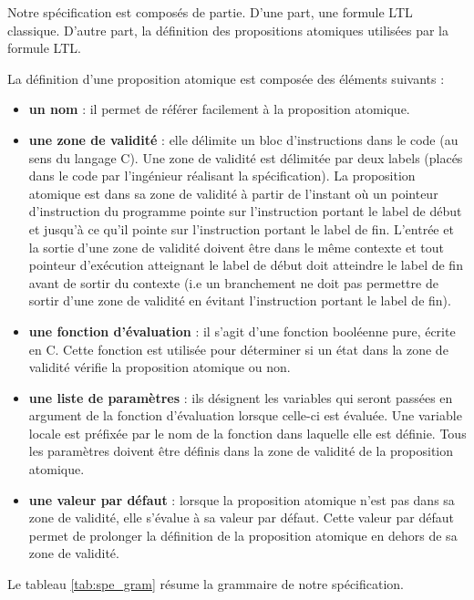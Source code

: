 Notre spécification est composés de partie. D'une part, une formule LTL
classique. D'autre part, la définition des propositions atomiques utilisées
par la formule LTL.

La définition d'une proposition atomique est composée des éléments suivants :

\begin{itemize}
\item
  \textbf{un nom} : il permet de référer facilement à la proposition atomique.
\item
  \textbf{une zone de validité} : elle délimite un bloc d'instructions dans
  le code (au sens du langage C). Une zone de validité est délimitée par deux
  labels (placés dans le code par l'ingénieur réalisant la spécification). La
  proposition atomique est dans sa zone de validité à partir de l'instant où un
  pointeur d'instruction du programme pointe sur l'instruction portant le label
  de début et jusqu'à ce qu'il pointe sur l'instruction portant le label de fin.
  L'entrée et la sortie d'une zone de validité doivent être dans le même
  contexte et tout pointeur d'exécution atteignant le label de début doit
  atteindre le label de fin avant de sortir du contexte (i.e un branchement ne
  doit pas permettre de sortir d'une zone de validité en évitant l'instruction
  portant le label de fin).
\item
  \textbf{une fonction d'évaluation} : il s'agit d'une fonction booléenne pure,
  écrite en C. Cette fonction est utilisée pour déterminer si un état
  dans la zone de validité vérifie la proposition atomique ou non.
\item
\textbf{une liste de paramètres} : ils désignent les variables qui seront
  passées en argument de la fonction d'évaluation lorsque celle-ci est évaluée.
  Une variable locale est préfixée par le nom de la fonction dans laquelle elle
  est définie. Tous les paramètres doivent être définis dans la zone de validité
  de la proposition atomique.
\item
  \textbf{une valeur par défaut} : lorsque la proposition atomique n'est pas dans
  sa zone de validité, elle s'évalue à sa valeur par défaut. Cette valeur par
  défaut permet de prolonger la définition de la proposition atomique en dehors
  de sa zone de validité.
\end{itemize}

Le tableau \ref{tab:spe_gram} résume la grammaire de notre spécification.

